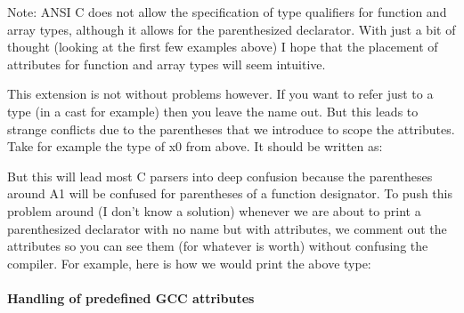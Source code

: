 \documentclass{article}
\begin{document}
\begin{enumerate}

\end{enumerate}

 Note: ANSI C does not allow the specification of type qualifiers for function
and array types, although it allows for the parenthesized declarator. With
just a bit of thought (looking at the first few examples above) I hope that
the placement of attributes for function and array types will seem intuitive.

 This extension is not without problems however. If you want to refer just to
a type (in a cast for example) then you leave the name out. But this leads to
strange conflicts due to the parentheses that we introduce to scope the
attributes. Take for example the type of x0 from above. It should be written
as: 
 

 But this will lead most C parsers into deep confusion because the parentheses
around A1 will be confused for parentheses of a function designator. To push
this problem around (I don't know a solution) whenever we are about to print a
parenthesized declarator with no name but with attributes, we comment out the
attributes so you can see them (for whatever is worth) without confusing the
compiler. For example, here is how we would print the above type:


 \paragraph{Handling of predefined GCC attributes}
\end{document}
